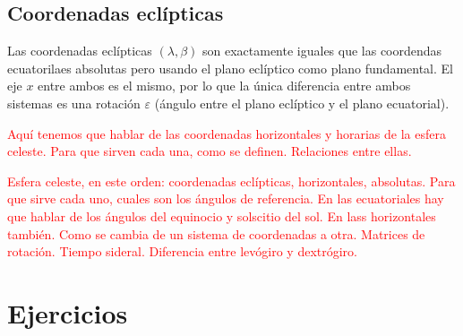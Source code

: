 \subsection{Coordenadas eclípticas}

Las coordenadas eclípticas $(\lambda,\beta)$ son exactamente iguales que las coordendas ecuatorilaes absolutas pero usando el plano eclíptico como plano fundamental. El eje $x$ entre ambos es el mismo, por lo que la única diferencia entre ambos sistemas es una rotación $\varepsilon$ (ángulo entre el plano eclíptico y el plano ecuatorial).

\begin{Anotacion}
	\textcolor{red}{Aquí tenemos que hablar de las coordenadas horizontales y horarias de la esfera celeste. Para que sirven cada una, como se definen. Relaciones entre ellas.}
\end{Anotacion}	



\begin{Anotacion}
	\textcolor{red}{Esfera celeste, en este orden: coordenadas eclípticas, horizontales, absolutas. Para que sirve cada uno, cuales son los ángulos de referencia. En las ecuatoriales hay que hablar de los ángulos del equinocio y solscitio del sol. En lass horizontales también. Como se cambia de un sistema de coordenadas a otra. Matrices de rotación. Tiempo sideral. Diferencia entre levógiro y dextrógiro. }
\end{Anotacion}	


\section{Ejercicios}


